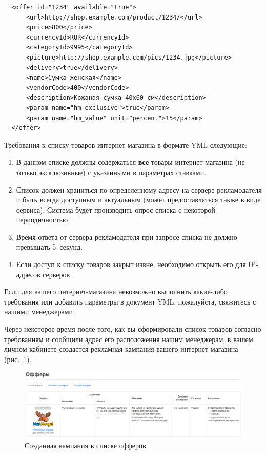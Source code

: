 \documentclass[a4paper,12pt]{article}
\begin{document}
\begin{footnotesize}
\begin{verbatim}
  <offer id="1234" available="true">
      <url>http://shop.example.com/product/1234/</url>
      <price>800</price>
      <currencyId>RUR</currencyId>
      <categoryId>9995</categoryId>
      <picture>http://shop.example.com/pics/1234.jpg</picture>
      <delivery>true</delivery>
      <name>Сумка женская</name>
      <vendorCode>400</vendorCode>
      <description>Кожаная сумка 40х60 см</description>
      <param name="hm_exclusive">true</param>
      <param name="hm_value" unit="percent">15</param>
  </offer>
\end{verbatim}
\end{footnotesize}

Требования к списку товаров интернет-магазина в формате YML следующие:
\begin{enumerate}
\item В данном списке должны содержаться \textbf{все} товары интернет-магазина (не только эксклюзивные) с указанными в параметрах ставками.
\item Список должен храниться по определенному адресу на сервере рекламодателя и быть всегда доступным и актуальным (может предоставляться также в виде сервиса). Система \heymoose{} будет производить опрос списка с некоторой периодичностью.
\item Время ответа от сервера рекламодателя при запросе списка не должно превышать 5~секунд.
\item Если доступ к списку товаров закрыт извне, необходимо открыть его для IP-адресов серверов \heymoose{}.
\end{enumerate}

Если для вашего интернет-магазина невозможно выполнить какие-либо требования или добавить параметры в документ YML, пожалуйста, свяжитесь с нашими менеджерами.

Через некоторое время после того, как вы сформировали список товаров согласно требованиям и сообщили адрес его расположения нашим менеджерам, в вашем личном кабинете создастся рекламная кампания вашего интернет-магазина (рис.~\ref{fig:offer}).

\begin{figure}[!ht]
\centering
\includegraphics[width=\textwidth]{include/offer.png}
\caption{Созданная кампания в списке офферов.}
\label{fig:offer}
\end{figure}
\end{document}
